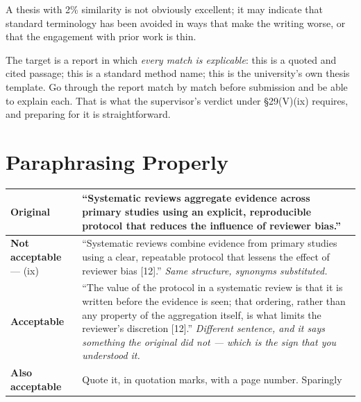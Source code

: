 \begin{conceptbox}
A thesis with 2\% similarity is not obviously excellent; it may indicate that
standard terminology has been avoided in ways that make the writing worse, or
that the engagement with prior work is thin.

\medskip
The target is a report in which \emph{every match is explicable}: this is a
quoted and cited passage; this is a standard method name; this is the
university's own thesis template. Go through the report match by match before
submission and be able to explain each. That is what the supervisor's verdict
under \S29(V)(ix) requires, and preparing for it is straightforward.
\end{conceptbox}

\section{Paraphrasing Properly}

\begin{center}
\small
\begin{tabular}{@{}L{4.6cm}L{9.7cm}@{}}
\toprule
\textbf{Original} & ``Systematic reviews aggregate evidence across primary
                    studies using an explicit, reproducible protocol that
                    reduces the influence of reviewer bias.'' \\
\midrule
\textbf{Not acceptable} --- (ix)
                  & ``Systematic reviews combine evidence from primary studies
                    using a clear, repeatable protocol that lessens the effect
                    of reviewer bias [12].'' \emph{Same structure, synonyms
                    substituted.} \\
\midrule
\textbf{Acceptable}
                  & ``The value of the protocol in a systematic review is that
                    it is written before the evidence is seen; that ordering,
                    rather than any property of the aggregation itself, is what
                    limits the reviewer's discretion [12].'' \emph{Different
                    sentence, and it says something the original did not ---
                    which is the sign that you understood it.} \\
\midrule
\textbf{Also acceptable}
                  & Quote it, in quotation marks, with a page number. Sparingly \\
\bottomrule
\end{tabular}
\end{center}


